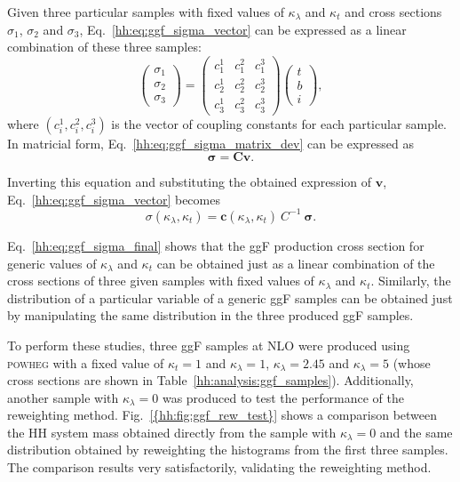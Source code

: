 \documentclass[../main.tex]{subfiles}
\begin{document}
Given three particular samples with fixed values of $\kappa_\lambda$ and $\kappa_t$ and cross sections $\sigma_1$, $\sigma_2$ and $\sigma_3$, Eq.~\eqref{hh:eq:ggf_sigma_vector} can be expressed as a linear combination of these three samples:
\begin{equation}
\label{hh:eq:ggf_sigma_matrix_dev}
\left(
\begin{matrix}
\sigma_1 \\ \sigma_2 \\ \sigma_3
\end{matrix}
\right)
= 
\left(
\begin{matrix}
c_1^1 & c_1^2& c_1^3 \\
c_2^1 & c_2^2& c_2^3 \\
c_3^1 & c_3^2& c_3^3
\end{matrix}
\right)
\left(
\begin{matrix}
t \\ b \\ i
\end{matrix}
\right),
\end{equation}
where $(c_i^1, c_i^2, c_i^3)$ is the vector of coupling constants for each particular sample. In matricial form, Eq.~\eqref{hh:eq:ggf_sigma_matrix_dev} can be expressed as
\begin{equation}
\mathbf{\sigma} = \mathbf{C}\mathbf{v}.
\end{equation}

Inverting this equation and substituting the obtained expression of $\mathbf{v}$, Eq.~\eqref{hh:eq:ggf_sigma_vector} becomes
\begin{equation}
\label{hh:eq:ggf_sigma_final}
\sigma(\kappa_\lambda, \kappa_t) = \mathbf{c}(\kappa_\lambda, \kappa_t)~C^{-1}~\mathbf{\sigma}.
\end{equation}

Eq.~\eqref{hh:eq:ggf_sigma_final} shows that the ggF production cross section for generic values of $\kappa_\lambda$ and $\kappa_t$ can be obtained just as a linear combination of the cross sections of three given samples with fixed values of  $\kappa_\lambda$ and $\kappa_t$. Similarly, the distribution of a particular variable of a generic ggF samples can be obtained just by manipulating the same distribution in the three produced ggF samples.

To perform these studies, three ggF samples at NLO were produced using \textsc{powheg} with a fixed value of $\kappa_t=1$ and $\kappa_\lambda=1$, $\kappa_\lambda=2.45$ and $\kappa_\lambda=5$ (whose cross sections are shown in Table~\ref{hh:analysis:ggf_samples}). Additionally, another sample with $\kappa_\lambda=0$ was produced to test the performance of the reweighting method. Fig.~\ref{{hh:fig:ggf_rew_test}} shows a comparison between the HH system mass obtained directly from the sample with $\kappa_\lambda=0$ and the same distribution obtained by reweighting the histograms from the first three samples. The comparison results very satisfactorily, validating the reweighting method. 
\end{document}
